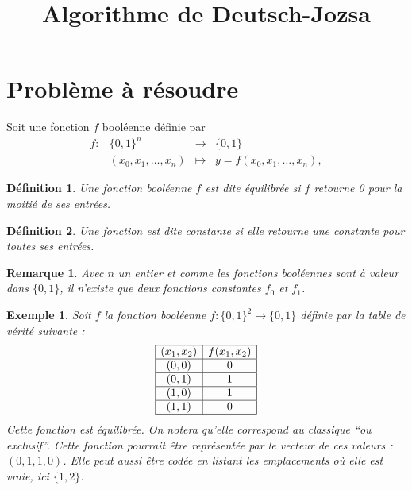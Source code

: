 \documentclass[12pt,a4paper]{article}
\title{Algorithme de Deutsch-Jozsa}
\date{}
\newtheorem{definition}{Définition}
\newtheorem{rem}{Remarque}
\newtheorem{ex}{Exemple}
\begin{document}
\maketitle

\section{Problème à résoudre}
Soit une fonction $f$ booléenne définie par 
\[
  \begin{array}{llll}
    f :  &  \{0, 1\}^n              & \to       & \{ 0, 1 \} \\
         &  (x_0, x_1, \dots , x_n) & \mapsto   &  y = f(x_0, x_1, \dots , x_n), 
  \end{array}  
\]

\begin{definition}
  Une fonction booléenne $f$ est dite équilibrée si $f$ retourne 0
  pour la moitié de ses entrées.
\end{definition}

\begin{definition}
  Une fonction est dite constante si elle retourne une constante pour
  toutes ses entrées.
\end{definition}


\begin{rem}
  Avec $n$ un entier et comme les fonctions booléennes sont à valeur
  dans $\{0,1\}$, il n'existe que deux fonctions constantes $f_0$ et
  $f_1$.
\end{rem}

\begin{ex}
  Soit $f$ la fonction booléenne $f : \{0,1\}^2 \to \{0,1\}$ définie
  par la table de vérité suivante :
\[
  \begin{array}{|c|c|}
    \hline
   (x_1, x_2) & f(x_1,x_2) \\
    \hline
    (0,0) & 0 \\
    \hline
    (0,1) & 1 \\
    \hline
    (1,0) & 1 \\
    \hline
    (1,1) & 0 \\
    \hline
  \end{array}
\]
Cette fonction est équilibrée. On notera qu'elle correspond au
classique ``ou exclusif''. Cette fonction pourrait être représentée
par le vecteur de ces valeurs : $(0,1,1,0)$. Elle peut aussi être
codée en listant les emplacements où elle est vraie, ici $\{1,2\}$.
\end{ex}
\end{document}
